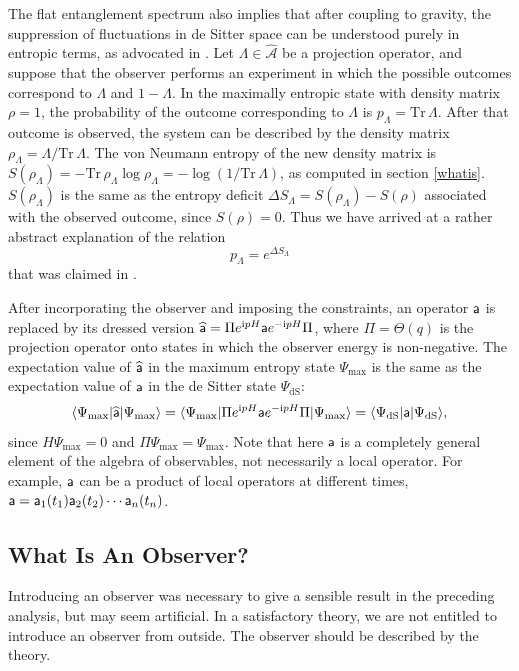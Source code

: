 \documentclass[11pt,a4paper]{article}
\def\a{{\sf a}}
\def\max{{\mathrm{max}}}
\def\be{\begin{equation}}
\def\ee{\end{equation}}
\def\h{\widehat}
\def\A{{\mathcal A}}
\def\h{\widehat}
\def\dS{{\mathrm{dS}}}
\def\la{\langle}
\def\ra{\rangle}
\def\i{{\mathrm i}}
\def\Tr{{\mathrm{Tr}}}
\begin{document}
   
The flat entanglement spectrum also implies that  after coupling to gravity, the suppression of fluctuations in de Sitter space can be understood purely in entropic terms, 
 as advocated in \cite{BanksOne,BanksTwo,Susskind}. 
Let $\Lambda\in\h\A$ be a projection operator, and suppose that the observer performs an experiment in which the possible outcomes correspond to $\Lambda$
and $1-\Lambda$.   In the maximally entropic state with density matrix $\rho=1$, the probability of the 
outcome corresponding to $\Lambda$ is $p_\Lambda=\Tr\,\Lambda$.   After that outcome is
observed, the system can be described by the density matrix $\rho_\Lambda=\Lambda/\Tr\,\Lambda$.     The von Neumann entropy of the new density matrix
is $S(\rho_\Lambda)=-\Tr\,\rho_\Lambda\log \rho_\Lambda=-\log(1/\Tr\,\Lambda)$, as computed in section \ref{whatis}.
$S(\rho_\Lambda)$ is the same
as the entropy deficit $\Delta S_\Lambda=S(\rho_\Lambda)-S(\rho)$ associated with the observed outcome, since $S(\rho)=0$.
Thus we have arrived at a rather abstract explanation of the relation
\be\label{zolgo} p_\Lambda = e^{\Delta S_\Lambda} \ee
that was claimed in \cite{BanksOne,Susskind}.

 
After incorporating the observer and imposing the constraints, an operator $\a$  is replaced by its dressed version $\h \a =\Pi e^{\i p H}\a e^{-\i p H}\Pi$, where $\Pi=\Theta(q)$
is the projection operator onto states in which the observer energy is non-negative.   The expectation value of $\h\a$ in the maximum entropy state $\Psi_\max$ is the
same as the expectation value of $\a$ in the de Sitter state $\Psi_\dS$:
\be\label{compar} \la \Psi_\max|\h\a|\Psi_\max\ra=\la\Psi_\max|\Pi e^{\i p H}\a e^{-\i p H}\Pi|\Psi_\max\ra =\la\Psi_\dS|\a|\Psi_\dS\ra,\ee
since $H\Psi_\max=0$ and $\Pi\Psi_\max=\Psi_\max$.    Note that here $\a$ is a completely general element of the algebra of observables, not
necessarily a local operator.   For example, $\a$ can be a product of local operators at different times, $\a=\a_1(t_1)\a_2(t_2)\cdots \a_n(t_n)$.


\subsection{What Is An Observer?}\label{observer}

Introducing an observer was necessary to give a sensible result in the preceding analysis, but may seem artificial.  In a satisfactory
theory, we are not entitled to introduce an observer from outside.  The observer should be described by the theory.
\end{document}
